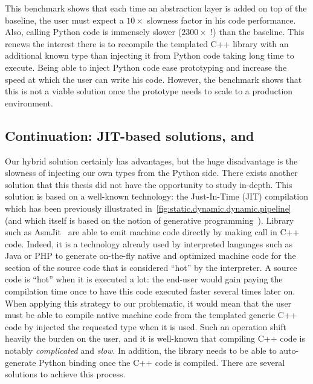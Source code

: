 This benchmark shows that each time an abstraction layer is added on top of the baseline, the user must expect a
\(10\times\) slowness factor in his code performance. Also, calling Python code is immensely slower (\(2300\times\) !)
than the baseline. This renews the interest there is to recompile the templated C++ library with an additional known
type than injecting it from Python code taking long time to execute. Being able to inject Python code ease prototyping
and increase the speed at which the user can write his code. However, the benchmark shows that this is not a viable
solution once the prototype needs to scale to a production environment.


\subsection{Continuation: JIT-based solutions, \pros and \cons}

Our hybrid solution certainly has advantages, but the huge disadvantage is the slowness of injecting our own types from
the Python side. There exists another solution that this thesis did not have the opportunity to study in-depth. This
solution is based on a well-known technology: the Just-In-Time (JIT) compilation which has been previously illustrated
in~\cref{fig:static.dynamic.dynamic.pipeline} (and which itself is based on the notion of generative
programming~\parencite{czarnecki.2000.generative}). Library such as AsmJit~\parencite{kobalicek.2011.asmjit} are able to
emit machine code directly by making call in C++ code. Indeed, it is a technology already used by interpreted languages
such as Java or PHP to generate on-the-fly native and optimized machine code for the section of the source code that is
considered ``hot'' by the interpreter. A source code is ``hot'' when it is executed a lot: the end-user would gain
paying the compilation time once to have this code executed faster several times later on. When applying this strategy
to our problematic, it would mean that the user must be able to compile native machine code from the templated generic
C++ code by injected the requested type when it is used. Such an operation shift heavily the burden on the user, and it
is well-known that compiling C++ code is notably \emph{complicated} and \emph{slow}. In addition, the library needs to
be able to auto-generate Python binding once the C++ code is compiled. There are several solutions to achieve this
process.

